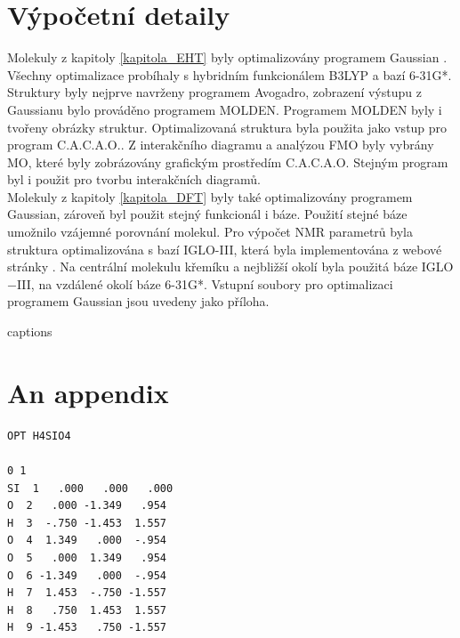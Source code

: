 \documentclass[
  digital, %
  table,   %
  lof,     %
  lot,     %
]{fithesis3}
\begin{document}
  \chapter{Výpočetní detaily}
  Molekuly z kapitoly \ref{kapitola_EHT} byly optimalizovány programem Gaussian \cite{g09}. Všechny optimalizace probíhaly s hybridním funkcionálem B3LYP a bazí 6-31G*. Struktury byly nejprve navrženy programem Avogadro, zobrazení výstupu z Gaussianu bylo prováděno programem MOLDEN. Programem MOLDEN byly i tvořeny obrázky struktur. Optimalizovaná struktura byla použita jako vstup pro program C.A.C.A.O.. Z interakčního diagramu a analýzou FMO byly vybrány MO, které byly zobrázovány grafickým prostředím C.A.C.A.O. Stejným program byl i použit pro tvorbu interakčních diagramů. \\
  Molekuly z kapitoly \ref{kapitola_DFT} byly také optimalizovány programem Gaussian, zároveň byl použit stejný funkcionál i báze. Použití stejné báze umožnilo vzájemné porovnání molekul. Pro výpočet NMR parametrů byla struktura optimalizována s bazí IGLO-III, která byla implementována z webové stránky  . Na centrální molekulu křemíku a nejbližší okolí byla použitá báze IGLO$-$III, na vzdálené okolí báze 6-31G*. Vstupní soubory pro optimalizaci programem Gaussian jsou uvedeny jako příloha.
  
{\csname captions\languagename\endcsname %
\makeatletter %
  \thesis@selectLocale{\thesis@locale}\makeatother
\printbibliography[heading=bibintoc]} %
\appendix %
\chapter{An appendix}
 \begin{verbatim}
OPT H4SIO4 

0 1
SI  1   .000   .000   .000 
O  2   .000 -1.349   .954 
H  3  -.750 -1.453  1.557 
O  4  1.349   .000  -.954 
O  5   .000  1.349   .954 
O  6 -1.349   .000  -.954 
H  7  1.453  -.750 -1.557 
H  8   .750  1.453  1.557 
H  9 -1.453   .750 -1.557 
 \end{verbatim}
 
\end{document}
